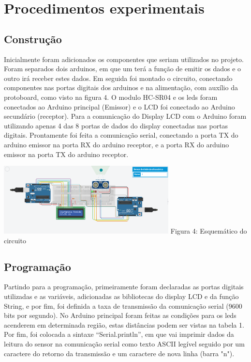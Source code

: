 \documentclass[conference]{IEEEtran}
\begin{document}
\section{Procedimentos experimentais }
\subsection{Construção}
Inicialmente foram adicionados os componentes que seriam utilizados no projeto. Foram separados dois arduinos, em que um terá a função de emitir os dados e o outro irá receber estes dados. Em seguida foi montado o circuito, conectando componentes nas portas digitais dos arduinos e na alimentação, com auxílio da protoboard, como visto na figura 4. O modulo HC-SR04 e os leds foram conectados ao Arduino principal (Emissor) e o LCD foi conectado ao Arduino secundário (receptor). Para a comunicação do Display LCD com o Arduino foram utilizando apenas 4 das 8 portas de dados do display conectadas nas portas digitais. Prontamente foi feita a comunicação serial, conectando a porta TX do arduino emissor na porta RX do arduino receptor, e a porta RX do arduino emissor na porta TX do arduino receptor. 


\begin{center}
    \includegraphics[width=9cm]{Esquematico.png}
    Figura 4: Esquemático do circuito
\end{center}

\subsection{Programação}
Partindo para a programação, primeiramente foram declaradas as portas digitais utilizadas e as variáveis, adicionadas as bibliotecas do display LCD e da função String, e por fim, foi definida a taxa de transmissão da comunicação serial (9600 bits por segundo). No Arduino principal foram feitas as condições para os leds acenderem em determinada região, estas distâncias podem ser vistas na tabela 1. Por fim, foi colocada a sintaxe “Serial.println”, em que vai imprimir dados da leitura do sensor na comunicação serial como texto ASCII legível seguido por um caractere do retorno da transmissão e um caractere de nova linha (barra "n").
\end{document}

